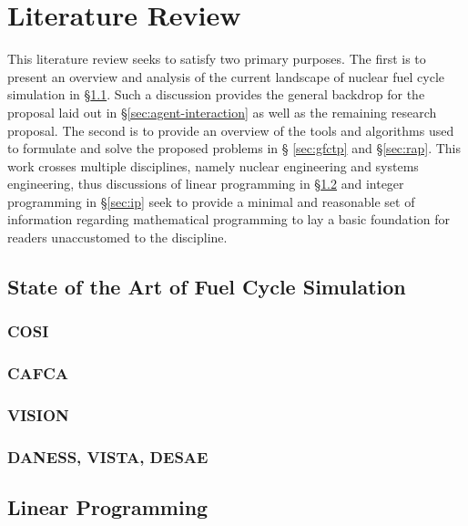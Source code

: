 \chapter{Literature Review}\label{ch:litreview}

This literature review seeks to satisfy two primary purposes. The first is to
present an overview and analysis of the current landscape of nuclear fuel cycle
simulation in \S \ref{sec:simulators}. Such a discussion provides the general
backdrop for the proposal laid out in \S \ref{sec:agent-interaction} as well as
the remaining research proposal. The second is to provide an overview of the
tools and algorithms used to formulate and solve the proposed problems in \S
\ref{sec:gfctp} and \S \ref{sec:rap}. This work crosses multiple disciplines,
namely nuclear engineering and systems engineering, thus discussions of linear
programming in \S \ref{sec:lp} and integer programming in \S \ref{sec:ip} seek
to provide a minimal and reasonable set of information regarding mathematical
programming to lay a basic foundation for readers unaccustomed to the
discipline.

\section{State of the Art of Fuel Cycle Simulation}\label{sec:simulators}


\subsection{COSI}\label{sec:cosi}


\subsection{CAFCA}\label{sec:cafca}


\subsection{VISION}\label{sec:vision}


\subsection{DANESS, VISTA, DESAE}\label{sec:other-sims}


\section{Linear Programming}\label{sec:lp}
\label{sec:lp-overview}

